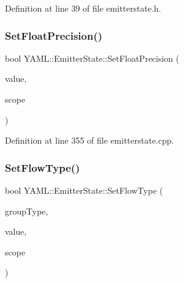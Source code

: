 Definition at line 39 of file emitterstate.\+h.

\mbox{\label{class_y_a_m_l_1_1_emitter_state_ab0f30356a4ff723c84b01e0b4d1e7ff4}} 
\subsubsection{\texorpdfstring{SetFloatPrecision()}{SetFloatPrecision()}}
{\footnotesize\ttfamily bool Y\+A\+M\+L\+::\+Emitter\+State\+::\+Set\+Float\+Precision (\begin{DoxyParamCaption}\item[{std\+::size\+\_\+t}]{value,  }\item[{\mbox{\hyperlink{struct_y_a_m_l_1_1_fmt_scope_a58c967eadfafdc79f62cd5c59ec2b1fe}{Fmt\+Scope\+::value}}}]{scope }\end{DoxyParamCaption})}



Definition at line 355 of file emitterstate.\+cpp.

\mbox{\label{class_y_a_m_l_1_1_emitter_state_a962c29e23608432b4217c5383cd59c88}} 
\subsubsection{\texorpdfstring{SetFlowType()}{SetFlowType()}}
{\footnotesize\ttfamily bool Y\+A\+M\+L\+::\+Emitter\+State\+::\+Set\+Flow\+Type (\begin{DoxyParamCaption}\item[{\mbox{\hyperlink{struct_y_a_m_l_1_1_group_type_aab9271cd8999a6694cb10670e6a5496f}{Group\+Type\+::value}}}]{group\+Type,  }\item[{\mbox{\hyperlink{namespace_y_a_m_l_a67c320aa50d3de7ecba1d0b8775dd684}{E\+M\+I\+T\+T\+E\+R\+\_\+\+M\+A\+N\+IP}}}]{value,  }\item[{\mbox{\hyperlink{struct_y_a_m_l_1_1_fmt_scope_a58c967eadfafdc79f62cd5c59ec2b1fe}{Fmt\+Scope\+::value}}}]{scope }\end{DoxyParamCaption})}



